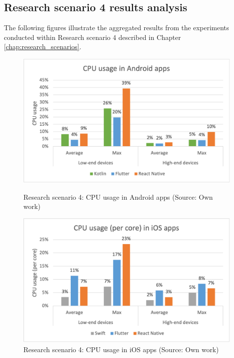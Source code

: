 

\subsection{Research scenario 4 results analysis}

The following figures illustrate the aggregated results from the experiments conducted within Research scenario 4 described in Chapter \ref{chap:research_scenarios}.

\begin{figure}[H]
    \begin{minipage}{.48\textwidth}
        \includegraphics[width=\textwidth]{img/scenario4_cpu_android}
        \caption{Research scenario 4: CPU usage in Android apps (Source: Own work)}
        \label{fig:s4_cpu_android}
    \end{minipage}
    \hfill
    \begin{minipage}{.48\textwidth}
        \includegraphics[width=\textwidth]{img/scenario4_cpu_ios}
        \caption{Research scenario 4: CPU usage in iOS apps (Source: Own work)}
        \label{fig:s4_cpu_ios}
    \end{minipage}
\end{figure}

